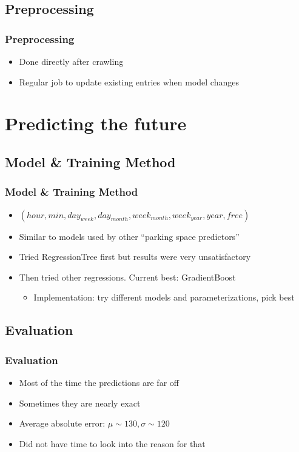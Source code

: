 \documentclass[11pt]{beamer}
\newcommand{\hod}{hour}
\newcommand{\moh}{min}
\newcommand{\dow}{day_{week}}
\newcommand{\dom}{day_{month}}
\newcommand{\wom}{week_{month}}
\newcommand{\woy}{week_{year}}
\newcommand{\yyy}{year}
\begin{document}
\subsection{Preprocessing}
\begin{frame}
  \frametitle{Preprocessing}
  \begin{itemize}
  	\item Done directly after crawling
  	\item Regular job to update existing entries when model changes
  \end{itemize}
\end{frame}


\section{Predicting the future}
\subsection{Model \& Training Method}
\begin{frame}
  \frametitle{Model \& Training Method}
  \begin{itemize}
    \item \((\hod, \moh, \dow, \dom, \wom, \woy, \yyy, free)\)
    \item Similar to models used by other ``parking space predictors''
    \item Tried RegressionTree first but results were very unsatisfactory
    \item Then tried other regressions. Current best: GradientBoost
    \begin{itemize}
      \item Implementation: try different models and parameterizations, pick best
    \end{itemize}
  \end{itemize}
\end{frame}

\subsection{Evaluation}
\begin{frame}
  \frametitle{Evaluation}
  \begin{itemize}
    \item Most of the time the predictions are far off
    \item Sometimes they are nearly exact
    \item Average absolute error: \(\mu \sim 130, \sigma \sim 120\)
    \item Did not have time to look into the reason for that
  \end{itemize}
\end{frame}
\end{document}
